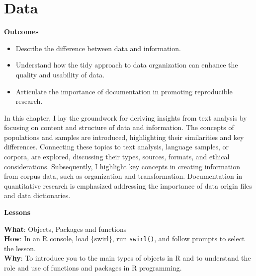 \documentclass[
  letterpaper,
]{book}
\providecommand{\tightlist}{%
  \setlength{\itemsep}{0pt}\setlength{\parskip}{0pt}}\usepackage{longtable,booktabs,array}
\theoremstyle{definition}
\theoremstyle{remark}
\begin{document}
\chapter{Data}\label{sec-data-chapter}

\begin{tcolorbox}[enhanced jigsaw, breakable, colframe=quarto-callout-color-frame, toprule=.15mm, arc=.35mm, colback=white, left=2mm, bottomrule=.15mm, rightrule=.15mm, opacityback=0, leftrule=.75mm]

\textbf{ Outcomes}

\begin{itemize}
\tightlist
\item
  Describe the difference between data and information.
\item
  Understand how the tidy approach to data organization can enhance the
  quality and usability of data.
\item
  Articulate the importance of documentation in promoting reproducible
  research.
\end{itemize}

\end{tcolorbox}

In this chapter, I lay the groundwork for deriving insights from text
analysis by focusing on content and structure of data and information.
The concepts of populations and samples are introduced, highlighting
their similarities and key differences. Connecting these topics to text
analysis, language samples, or corpora, are explored, discussing their
types, sources, formats, and ethical considerations. Subsequently, I
highlight key concepts in creating information from corpus data, such as
organization and transformation. Documentation in quantitative research
is emphasized addressing the importance of data origin files and data
dictionaries.

\begin{tcolorbox}[enhanced jigsaw, breakable, colframe=quarto-callout-color-frame, toprule=.15mm, arc=.35mm, colback=white, left=2mm, bottomrule=.15mm, rightrule=.15mm, opacityback=0, leftrule=.75mm]

\textbf{ Lessons}

\textbf{What}: Objects, Packages and functions\\
\textbf{How}: In an R console, load \{swirl\}, run \texttt{swirl()}, and
follow prompts to select the lesson.\\
\textbf{Why}: To introduce you to the main types of objects in R and to
understand the role and use of functions and packages in R programming.

\end{tcolorbox}
\end{document}
